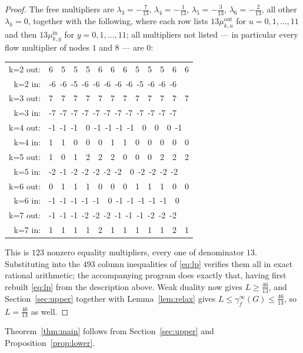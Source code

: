 \documentclass[11pt]{amsart}
\theoremstyle{remark}
\newcommand{\fed}{\gamma_f^{\infty}}
\begin{document}
\begin{proof}
The free multipliers are $\lambda_3=-\tfrac7{13}$,
$\lambda_4=-\tfrac1{13}$, $\lambda_5=-\tfrac3{13}$,
$\lambda_6=-\tfrac2{13}$, all other $\lambda_k=0$, together with the
following, where each row lists $13\mu^{\mathrm{out}}_{k,u}$ for
$u=0,1,\dots,11$ and then $13\mu^{\mathrm{in}}_{k,y}$ for $y=0,1,\dots,11$;
all multipliers not listed --- in particular every flow multiplier of nodes
$1$ and $8$ --- are $0$:
\begin{center}\ttfamily\small
\begin{tabular}{@{}r@{\ \ }l@{}}
k=2 out: &  6\ \ 5\ \ 5\ \ 5\ \ 6\ \ 6\ \ 6\ \ 5\ \ 5\ \ 5\ \ 6\ \ 6\\
k=2 in:  & -6\ -6\ -5\ -6\ -6\ -6\ -6\ -6\ -5\ -6\ -6\ -6\\
k=3 out: &  7\ \ 7\ \ 7\ \ 7\ \ 7\ \ 7\ \ 7\ \ 7\ \ 7\ \ 7\ \ 7\ \ 7\\
k=3 in:  & -7\ -7\ -7\ -7\ -7\ -7\ -7\ -7\ -7\ -7\ -7\ -7\\
k=4 out: & -1\ -1\ -1\ \ 0\ -1\ -1\ -1\ -1\ \ 0\ \ 0\ \ 0\ -1\\
k=4 in:  &  1\ \ 1\ \ 0\ \ 0\ \ 0\ \ 1\ \ 1\ \ 0\ \ 0\ \ 0\ \ 0\ \ 0\\
k=5 out: &  1\ \ 0\ \ 1\ \ 2\ \ 2\ \ 2\ \ 0\ \ 0\ \ 0\ \ 2\ \ 2\ \ 2\\
k=5 in:  & -2\ -1\ -2\ -2\ -2\ -2\ -2\ \ 0\ -2\ -2\ -2\ -2\\
k=6 out: &  0\ \ 1\ \ 1\ \ 1\ \ 0\ \ 0\ \ 0\ \ 1\ \ 1\ \ 1\ \ 0\ \ 0\\
k=6 in:  & -1\ -1\ -1\ -1\ -1\ \ 0\ -1\ -1\ -1\ -1\ -1\ \ 0\\
k=7 out: & -1\ -1\ -1\ -2\ -2\ -2\ -1\ -1\ -1\ -2\ -2\ -2\\
k=7 in:  &  1\ \ 1\ \ 1\ \ 1\ \ 2\ \ 1\ \ 1\ \ 1\ \ 1\ \ 1\ \ 2\ \ 1
\end{tabular}
\end{center}
This is $123$ nonzero equality multipliers, every one of denominator $13$.
Substituting into the $493$ column inequalities of \eqref{eq:lp} verifies them
all in exact rational arithmetic; the accompanying program does exactly that,
having first rebuilt \eqref{eq:lp} from the description above. Weak duality now
gives $L\ge\tfrac{46}{13}$, and Section~\ref{sec:upper} together with
Lemma~\ref{lem:relax} gives $L\le\fed(G)\le\tfrac{46}{13}$, so
$L=\tfrac{46}{13}$ as well.
\end{proof}

Theorem~\ref{thm:main} follows from Section~\ref{sec:upper} and
Proposition~\ref{prop:lower}.
\end{document}
